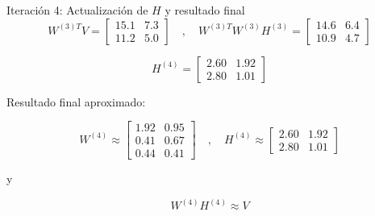 \documentclass{beamer}
\begin{document}
\begin{frame}{Iteración 4: Actualización de \( H \) y resultado final}
\[
W^{(3)T} V = \begin{bmatrix}
15.1 & 7.3 \\
11.2 & 5.0
\end{bmatrix}
\quad , \quad
W^{(3)T} W^{(3)} H^{(3)} = \begin{bmatrix}
14.6 & 6.4 \\
10.9 & 4.7
\end{bmatrix}
\]

\[
H^{(4)} = \begin{bmatrix}
2.60 & 1.92 \\
2.80 & 1.01
\end{bmatrix}
\]

Resultado final aproximado:

\[
W^{(4)} \approx \begin{bmatrix}
1.92 & 0.95 \\
0.41 & 0.67 \\
0.44 & 0.41
\end{bmatrix}
\quad , \quad
H^{(4)} \approx \begin{bmatrix}
2.60 & 1.92 \\
2.80 & 1.01
\end{bmatrix}
\]

y

\[
W^{(4)} H^{(4)} \approx V
\]
\end{frame}
\end{document}
